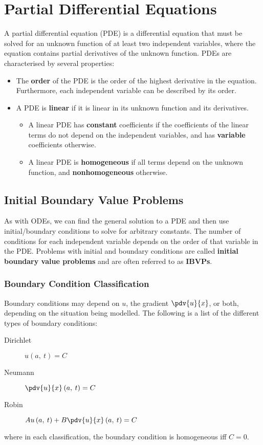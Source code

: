 \documentclass{article}
\begin{document}
\section{Partial Differential Equations}
A partial differential equation (PDE) is a differential equation that must be solved for an unknown function of at least two independent variables,
where the equation contains partial derivatives of the unknown function.
PDEs are characterised by several properties:
\begin{itemize}
    \item The \textbf{order} of the PDE is the order of the highest derivative in the equation.
          Furthermore, each independent variable can be described by its order.
    \item A PDE is \textbf{linear} if it is linear in its unknown function and its derivatives.
          \begin{itemize}
              \item A linear PDE has \textbf{constant} coefficients if the coefficients of the linear terms do not depend on the independent variables, and has \textbf{variable} coefficients otherwise.
              \item A linear PDE is \textbf{homogeneous} if all terms depend on the unknown function, and \textbf{nonhomogeneous} otherwise.
          \end{itemize}
\end{itemize}
\subsection{Initial Boundary Value Problems}
As with ODEs, we can find the general solution to a PDE and then use initial/boundary conditions to solve for arbitrary constants.
The number of conditions for each independent variable depends on the order of that variable in the PDE\@. Problems with initial and boundary
conditions are called \textbf{initial boundary value problems} and are often referred to as \textbf{IBVPs}.
\subsubsection{Boundary Condition Classification}
Boundary conditions may depend on \(u\), the gradient \(\pdv{u}{x}\), or both, depending
on the situation being modelled. The following is a list of the different types of boundary conditions:
\begin{description}
    \item[Dirichlet] \(u\left( a,\: t \right) = C\)
    \item[Neumann] \(\pdv{u}{x} \left( a,\: t \right) = C\)
    \item[Robin] \(A u\left( a,\: t \right) + B \pdv{u}{x} \left( a,\: t \right) = C\)
\end{description}
where in each classification, the boundary condition is homogeneous iff \(C = 0\).
\end{document}
